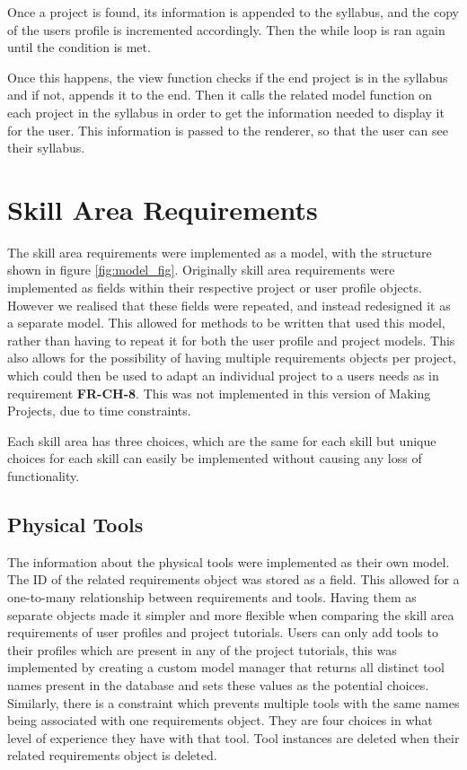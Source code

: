 \documentclass{l4proj}
\begin{document}
Once a project is found, its information is appended to the syllabus, and the copy of the users profile is incremented accordingly. Then the while loop is ran again until the condition is met. 

Once this happens, the view function checks if the end project is in the syllabus and if not, appends it to the end. Then it calls the related model function on each project in the syllabus in order to get the information needed to display it for the user. This information is passed to the renderer, so that the user can see their syllabus. 


\section{Skill Area Requirements} 
The skill area requirements were implemented as a model, with the structure shown in figure \ref{fig:model_fig}. Originally skill area requirements were implemented as fields within their respective project or user profile objects. However we realised that these fields were repeated, and instead redesigned it as a separate model. This allowed for methods to be written that used this model, rather than having to repeat it for both the user profile and project models. 
This also allows for the possibility of having multiple requirements objects per project, which could then be used to adapt an individual project to a users needs as in requirement 
\textbf{FR-CH-8}. This was not implemented in this version of Making Projects, due to time constraints. 

Each skill area has three choices, which are the same for each skill but unique choices for each skill can easily be implemented without causing any loss of functionality.  

\subsection{Physical Tools}
The information about the physical tools were implemented as their own model. The ID of the related requirements object was stored as a field. This allowed for a one-to-many relationship between requirements and tools. Having them as separate objects made it simpler and more flexible when comparing the skill area requirements of user profiles and project tutorials. Users can only add tools to their profiles which are present in any of the project tutorials, this was implemented by creating a custom model manager that returns all distinct tool names present in the database and sets these values as the potential choices. Similarly, there is a constraint which prevents multiple tools with the same names being associated with one requirements object. They are four choices in what level of experience they have with that tool. Tool instances are deleted when their related requirements object is deleted.
\end{document}

